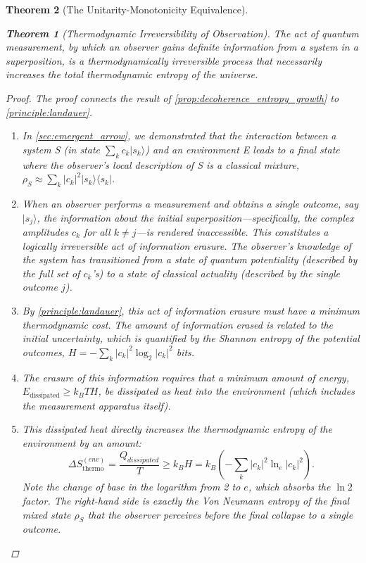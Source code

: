 \documentclass[11pt, letterpaper]{report}
\theoremstyle{plain} %
\newtheorem{theorem}{Theorem}[chapter]
\theoremstyle{definition} %
\theoremstyle{remark} %
\begin{document}
\begin{theorem}[The Unitarity-Monotonicity Equivalence]
\begin{theorem}[Thermodynamic Irreversibility of Observation]
\label{thm:thermo_irreversibility}
The act of quantum measurement, by which an observer gains definite information from a system in a superposition, is a thermodynamically irreversible process that necessarily increases the total thermodynamic entropy of the universe.
\end{theorem}
\begin{proof}
The proof connects the result of \cref{prop:decoherence_entropy_growth} to \cref{principle:landauer}.
\begin{enumerate}
    \item In \cref{sec:emergent_arrow}, we demonstrated that the interaction between a system S (in state $\sum_k c_k |s_k\rangle$) and an environment E leads to a final state where the observer's local description of S is a classical mixture, $\rho_S \approx \sum_k |c_k|^2 |s_k\rangle\langle s_k|$.
    \item When an observer performs a measurement and obtains a single outcome, say $|s_j\rangle$, the information about the initial superposition—specifically, the complex amplitudes $c_k$ for all $k \neq j$—is rendered inaccessible. This constitutes a logically irreversible act of information erasure. The observer's knowledge of the system has transitioned from a state of quantum potentiality (described by the full set of $c_k$'s) to a state of classical actuality (described by the single outcome $j$).
    \item By \cref{principle:landauer}, this act of information erasure must have a minimum thermodynamic cost. The amount of information erased is related to the initial uncertainty, which is quantified by the Shannon entropy of the potential outcomes, $H = -\sum_k |c_k|^2 \log_2 |c_k|^2$ bits.
    \item The erasure of this information requires that a minimum amount of energy, $E_{\text{dissipated}} \ge k_B T H$, be dissipated as heat into the environment (which includes the measurement apparatus itself).
    \item This dissipated heat directly increases the thermodynamic entropy of the environment by an amount:
    \begin{equation}
        \Delta S_{\text{thermo}}^{(env)} = \frac{Q_{dissipated}}{T} \ge k_B H = k_B \left(-\sum_k |c_k|^2 \ln_e |c_k|^2\right).
        \label{eq:thermo_entropy_increase}
    \end{equation}
    Note the change of base in the logarithm from 2 to $e$, which absorbs the $\ln 2$ factor. The right-hand side is exactly the Von Neumann entropy of the final mixed state $\rho_S$ that the observer perceives before the final collapse to a single outcome.

\end{enumerate}
\end{proof}
\end{theorem}
\end{document}
